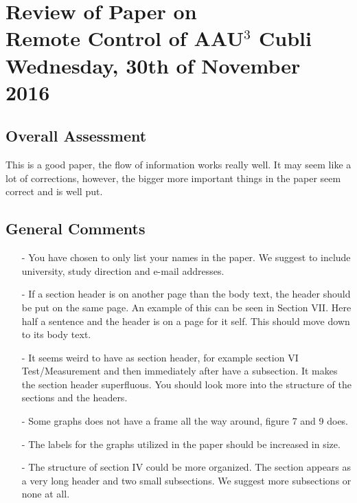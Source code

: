 
\renewcommand{\vec}[1]{\boldsymbol{\mathbf{#1}}}

\renewcommand\chaptername{KAPITEL}
\renewcommand\contentsname{Indhold}
\renewcommand\figurename{Figur}
\renewcommand\tablename{Tabel}

\section*{Review of Paper on\\
Remote Control of AAU$^3$ Cubli\\
\small Wednesday, 30th of November 2016}
\subsection{Overall Assessment}
This is a good paper, the flow of information works really well. It may seem like a lot of corrections, however, the bigger more important things in the paper seem correct and is well put.
\subsection{General Comments}
\begin{itemize}
\item[-]You have chosen to only list your names in the paper. We suggest to include university, study direction and e-mail addresses. 

	\item[-]If a section header is on another page than the body text, the header should be put on the same page. An example of this can be seen in Section VII. Here half a sentence and the header is on a page for it self. This should move down to its body text. 
	\item[-]It seems weird to have as section header, for example section VI Test/Measurement and then immediately after have a subsection. It makes the section header superfluous. You should look more into the structure of the sections and the headers.

\item[-]Some graphs does not have a frame all the way around, figure 7 and 9 does.

\item[-]The labels for the graphs utilized in the paper should be increased in size.

\item[-]The structure of section IV could be more organized. The section appears as a very long header and two small subsections. We suggest more subsections or none at all.

\end{itemize}	
